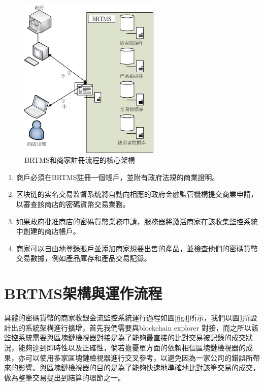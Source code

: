 	\begin{figure}[h]
		\centering
		\includegraphics[width = 0.6\textwidth]{fig3.png}
		\caption{BRTMS和商家註冊流程的核心架構}\label{fig3}
	\end{figure}

	\begin{enumerate}
		\item 商戶必須在BRTMS註冊一個帳戶，並附有政府法規的商業證明。
		\item 区块链的实名交易监督系统將自動向相應的政府金融監管機構提交商業申請，以審查該商店的密碼貨幣交易業務。
		\item 如果政府批准商店的密碼貨幣業務申請，服務器將激活商家在該收集監控系統中創建的商店帳戶。
		\item 商家可以自由地登錄賬戶並添加商家想要出售的產品，並檢查他們的密碼貨幣交易數據，例如產品庫存和產品交易記錄。
	\end{enumerate}

	\section{BRTMS架構與運作流程}
	具體的密碼貨幣的商家收銀金流監控系統運行過程如圖\ref{fig4}所示，我們以圖\ref{fig3}所設計出的系統架構進行擴增，首先我們需要與blockchain explorer 對接，而之所以該監控系統需要與區塊鏈檢視器對接是為了能夠最直接的比對交易被記錄的成交狀況，能夠達到即時性以及正確性，倘若擔憂單方面的依賴相信區塊鏈檢視器的成果，亦可以使用多家區塊鏈檢視器進行交叉參考，以避免因為一家公司的錯誤所帶來的影響。與區塊鏈檢視器的目的是為了能夠快速地準確地比對該筆交易的成交，做為整筆交易提出到結算的環節之一。


